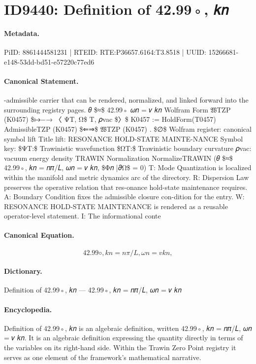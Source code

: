 \section*{ID9440: Definition of 42.99◦, 𝑘𝑛}
\paragraph{Metadata.}
PiID: 8861444581231 | RTEID: RTE:P36657.6164:T3.8518 | UUID: 15266681-e148-53dd-bd51-e57220c77ed6

\paragraph{Canonical Statement.}
-admissible carrier that can be rendered, normalized, and linked forward into the surrounding registry pages. 𝜃 \$≈\$ 42.99◦ 𝜔𝑛 = 𝑣 𝑘𝑛 Wolfram Form 𝔚TZP (K0457) \$↦−→ 〈 ΨT, Ω\$ T, 𝜌vac \$〉\$ K0457 := HoldForm(T0457) AdmissibleTZP (K0457) \$⇐⇒\$ 𝔚TZP (K0457) . \$∅\$ Wolfram register: canonical symbol lift Title lift: RESONANCE HOLD-STATE MAINTE-NANCE Symbol key: \$ΨT:\$ Trawinistic wavefunction \$ΩT:\$ Trawinistic boundary curvature 𝜌vac: vacuum energy density TRAWIN Normalization NormalizeTRAWIN (𝜃 \$≈\$ 42.99◦, 𝑘𝑛 = 𝑛𝜋/𝐿, 𝜔𝑛 = 𝑣 𝑘𝑛, \$Φ𝑛 |𝜕Ω\$ = 0) T: Mode Quantization is localized within the manifold and metric dynamics arc of the directory. R: Dispersion Law preserves the operative relation that res-onance hold-state maintenance requires. A: Boundary Condition fixes the admissible closure con-dition for the entry. W: RESONANCE HOLD-STATE MAINTENANCE is rendered as a reusable operator-level statement. I: The informational conte

\paragraph{Canonical Equation.}
\[
42.99◦, 𝑘𝑛 = 𝑛𝜋/𝐿, 𝜔𝑛 = 𝑣 𝑘𝑛,
\]

\paragraph{Dictionary.}
Definition of 42.99◦, 𝑘𝑛 — 42.99◦, 𝑘𝑛 = 𝑛𝜋/𝐿, 𝜔𝑛 = 𝑣 𝑘𝑛

\paragraph{Encyclopedia.}
Definition of 42.99◦, 𝑘𝑛 is an algebraic definition, written 42.99◦, 𝑘𝑛 = 𝑛𝜋/𝐿, 𝜔𝑛 = 𝑣 𝑘𝑛. It is an algebraic definition expressing the quantity directly in terms of the variables on its right-hand side. Within the Trawin Zero Point registry it serves as one element of the framework's mathematical narrative.
